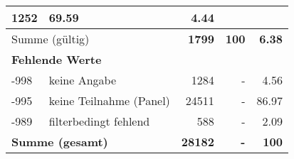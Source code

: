 \begin{longtable}{lXrrr}
       \num{1252} &
       \num[round-mode=places,round-precision=2]{69,59} &
         \num[round-mode=places,round-precision=2]{4,44} \\
     \midrule
     \multicolumn{2}{l}{Summe (gültig)} &
       \textbf{\num{1799}} &
     \textbf{100} &
       \textbf{\num[round-mode=places,round-precision=2]{6,38}} \\
     \multicolumn{5}{l}{\textbf{Fehlende Werte}}\\
       -998 &
       keine Angabe &
         \num{1284} &
        - &
         \num[round-mode=places,round-precision=2]{4,56} \\
       -995 &
       keine Teilnahme (Panel) &
         \num{24511} &
        - &
         \num[round-mode=places,round-precision=2]{86,97} \\
       -989 &
       filterbedingt fehlend &
         \num{588} &
        - &
         \num[round-mode=places,round-precision=2]{2,09} \\
     \midrule
     \multicolumn{2}{l}{\textbf{Summe (gesamt)}} &
          \textbf{\num{28182}} &
        \textbf{-} &
        \textbf{100} \\
     \bottomrule
     \end{longtable}
     
